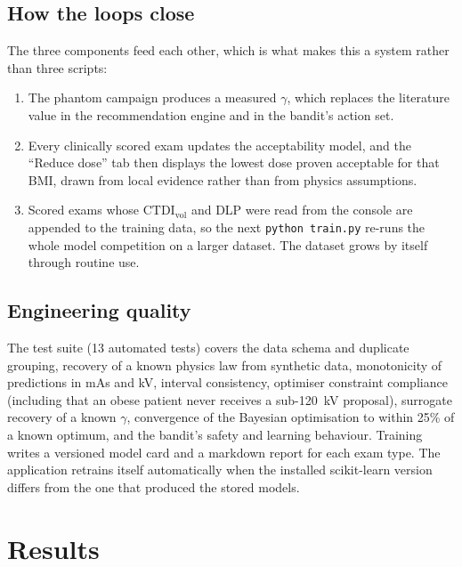 \documentclass[10pt,a4paper]{article}
\newcommand{\ctdi}{\ensuremath{\mathrm{CTDI}_{\mathrm{vol}}}}
\begin{document}
\subsection{How the loops close}
The three components feed each other, which is what makes this a system rather than three scripts:
\begin{enumerate}
\item The phantom campaign produces a measured $\gamma$, which replaces the literature value in the recommendation
engine and in the bandit's action set.
\item Every clinically scored exam updates the acceptability model, and the ``Reduce dose'' tab then displays the
lowest dose proven acceptable for that BMI, drawn from local evidence rather than from physics assumptions.
\item Scored exams whose \ctdi{} and DLP were read from the console are appended to the training data, so the next
\texttt{python train.py} re-runs the whole model competition on a larger dataset. The dataset grows by itself
through routine use.
\end{enumerate}

\subsection{Engineering quality}
The test suite (13 automated tests) covers the data schema and duplicate grouping, recovery of a known physics law
from synthetic data, monotonicity of predictions in mAs and kV, interval consistency, optimiser constraint
compliance (including that an obese patient never receives a sub-120~kV proposal), surrogate recovery of a known
$\gamma$, convergence of the Bayesian optimisation to within 25\% of a known optimum, and the bandit's safety and
learning behaviour. Training writes a versioned model card and a markdown report for each exam type. The
application retrains itself automatically when the installed scikit-learn version differs from the one that
produced the stored models.

\section{Results}
\end{document}
